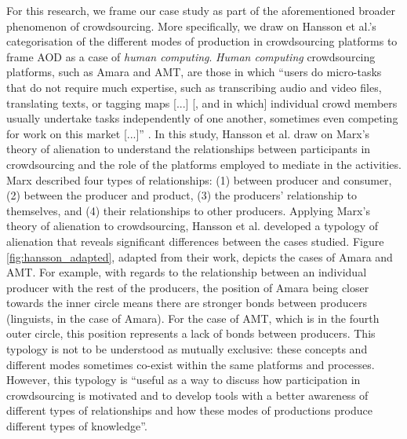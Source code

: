 For this research, we frame our case study as part of the aforementioned broader phenomenon of crowdsourcing. More specifically, we draw on Hansson et al.'s \cite{hansson_capitalizing_2018, hansson_alienation_2017} categorisation of the different modes of production in crowdsourcing platforms to frame AOD as a case of \textit{human computing}.  \textit{Human computing} crowdsourcing platforms, such as Amara and AMT, are those in which ``users do micro-tasks that do not require much expertise, such as transcribing audio and video files, translating texts, or tagging maps [...] [, and in which] individual crowd members usually undertake tasks independently of one another, sometimes even competing for work on this market [...]'' \cite{hansson_capitalizing_2018}. In this study, Hansson et al. \cite{hansson_capitalizing_2018} draw on Marx's \cite{10.2307/2550890} theory of alienation to understand the relationships between participants in crowdsourcing and the role of the platforms employed to mediate in the activities. Marx \cite{10.2307/2550890} described four types of relationships: (1) between producer and consumer, (2) between the producer and product, (3) the producers’ relationship to themselves, and (4) their relationships to other producers. Applying Marx's theory of alienation to crowdsourcing, Hansson et al. \cite{hansson_capitalizing_2018} developed a typology of alienation that reveals significant differences between the cases studied. Figure \ref{fig:hansson_adapted}, adapted from their work, depicts the cases of Amara and AMT. For example, with regards to the relationship between an individual producer with the rest of the producers, the position of Amara being closer towards the inner circle means there are stronger bonds between producers (linguists, in the case of Amara). For the case of AMT, which is in the fourth outer circle, this position represents a lack of bonds between producers. This typology is not to be understood as mutually exclusive: these concepts and different modes sometimes co-exist within the same platforms and processes. However, this typology is ``useful as a way to discuss how participation in crowdsourcing is motivated and to develop tools with a better awareness of different types of relationships and how these modes of productions produce different types of knowledge''.

